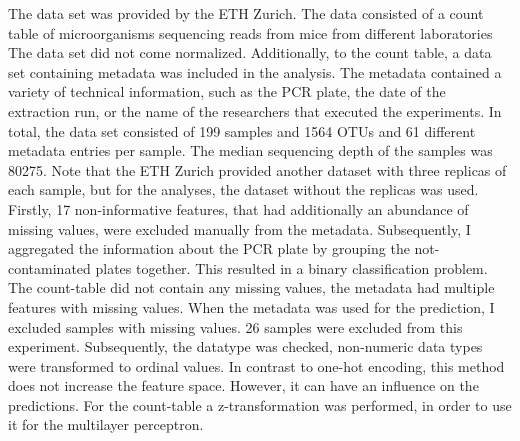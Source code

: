 \documentclass{svproc}
\begin{document}

The data set was provided by the ETH Zurich. The data consisted of a count table of microorganisms sequencing reads from mice from different laboratories The data set did not come normalized. Additionally, to the count table, a data set containing metadata was included in the analysis. The metadata contained a variety of technical information, such as the PCR plate, the date of the extraction run, or the name of the researchers that executed the experiments. In total, the data set consisted of 199 samples and 1564 OTUs and 61 different metadata entries per sample. The median sequencing depth of the samples was 80275. Note that the ETH Zurich provided another dataset with three replicas of each sample, but for the analyses, the dataset without the replicas was used.\\
Firstly, 17 non-informative features, that had additionally an abundance of missing values, were excluded manually from the metadata. Subsequently, I aggregated the information about the PCR plate by grouping the not-contaminated plates together. This resulted in a binary classification problem. The count-table did not contain any missing values, the metadata had multiple features with missing values. When the metadata was used for the prediction, I excluded samples with missing values. 26 samples were excluded from this experiment. Subsequently, the datatype was checked, non-numeric data types were transformed to ordinal values. In contrast to one-hot encoding, this method does not increase the feature space. However, it can have an influence on the predictions.
For the count-table a z-transformation was performed, in order to use it for the multilayer perceptron.\\
\end{document}
